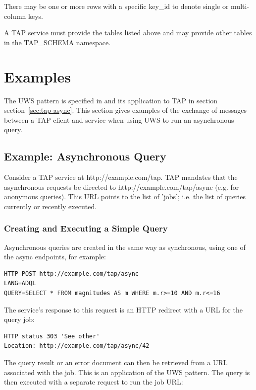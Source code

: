 \documentclass[11pt,letter]{ivoa}
\begin{document}
There may be one or more rows with a specific key\_id to 
denote single or multi-column keys.

A TAP service must provide the tables listed above and may provide other tables 
in the TAP\_SCHEMA namespace.


\section{Examples}
\label{sec:examples}

The UWS pattern is specified in \citep{std:UWS} and its application to TAP in 
section 
section~\ref{sec:tap-async}. This section gives examples of the exchange of messages between a 
TAP client and service when using UWS to run an asynchronous query.

\subsection{Example: Asynchronous Query}
Consider a TAP service at http://example.com/tap. TAP mandates that the 
asynchronous requests be directed to http://example.com/tap/async (e.g. for 
anonymous queries). This URL points to the list of 'jobs'; i.e. the list of 
queries currently or recently executed.

\subsubsection{Creating and Executing a Simple Query}

Asynchronous queries are created in the same way as synchronous, using 
one of the {async} endpoints, for example:

\begin{verbatim}
HTTP POST http://example.com/tap/async
LANG=ADQL
QUERY=SELECT * FROM magnitudes AS m WHERE m.r>=10 AND m.r<=16
\end{verbatim}

The service's response to this request is an HTTP redirect with a URL for the 
query job:

\begin{verbatim}
HTTP status 303 'See other'
Location: http://example.com/tap/async/42
\end{verbatim}

The query result or an error document can then be retrieved from a URL 
associated with the job. This is an application of the UWS pattern. The query is 
then executed with a separate request to run the job URL:
\end{document}
